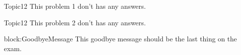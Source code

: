 \documentclass[master]{exam}
\begin{document}
    \begin{problem}{Topic1}{2}
        This problem 1 don't has any answers.
    \end{problem}
    
    \begin{problem}{Topic1}{2}
        This problem 2 don't has any answers.
    \end{problem}
    
    
\begin{block}{block:GoodbyeMessage}
    This goodbye message should be the last thing on the exam.
\end{block}
    
        
\end{document}
